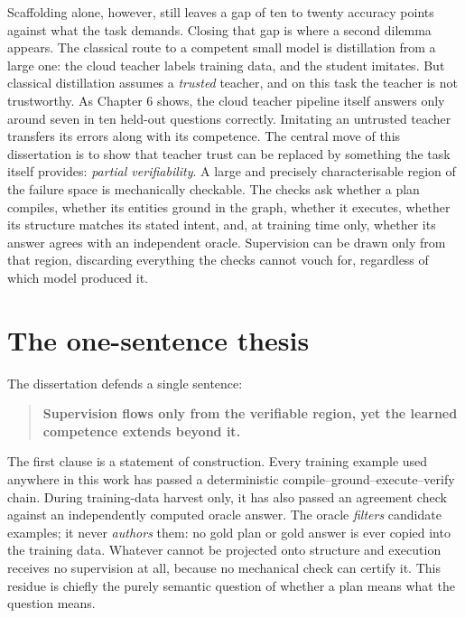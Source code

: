 \documentclass[10pt]{article} %
\begin{document}
Scaffolding alone, however, still leaves a gap of ten to twenty accuracy points against what the task demands. Closing that gap is where a second dilemma appears. The classical route to a competent small model is distillation from a large one: the cloud teacher labels training data, and the student imitates. But classical distillation assumes a \emph{trusted} teacher, and on this task the teacher is not trustworthy. As Chapter 6 shows, the cloud teacher pipeline itself answers only around seven in ten held-out questions correctly. Imitating an untrusted teacher transfers its errors along with its competence. The central move of this dissertation is to show that teacher trust can be replaced by something the task itself provides: \emph{partial verifiability}. A large and precisely characterisable region of the failure space is mechanically checkable. The checks ask whether a plan compiles, whether its entities ground in the graph, whether it executes, whether its structure matches its stated intent, and, at training time only, whether its answer agrees with an independent oracle. Supervision can be drawn only from that region, discarding everything the checks cannot vouch for, regardless of which model produced it.

\section{The one-sentence thesis}\label{sec:the-one-sentence-thesis}

The dissertation defends a single sentence:

\begin{quote}
\textbf{Supervision flows only from the verifiable region, yet the learned competence extends beyond it.}
\end{quote}

The first clause is a statement of construction. Every training example used anywhere in this work has passed a deterministic compile--ground--execute--verify chain. During training-data harvest only, it has also passed an agreement check against an independently computed oracle answer. The oracle \emph{filters} candidate examples; it never \emph{authors} them: no gold plan or gold answer is ever copied into the training data. Whatever cannot be projected onto structure and execution receives no supervision at all, because no mechanical check can certify it. This residue is chiefly the purely semantic question of whether a plan means what the question means.
\end{document}
